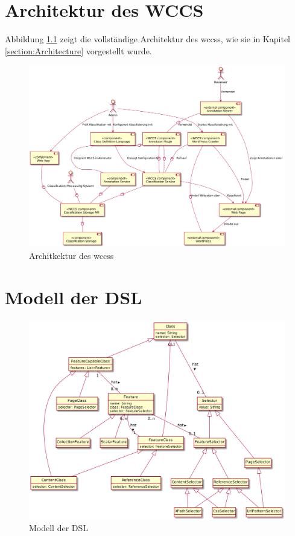 \chapter{Architektur des WCCS}
    Abbildung \ref{image:wccsExternalArchitecture} zeigt die vollständige Architektur des \glspl{wccs},
    wie sie in Kapitel \ref{section:Architecture} vorgestellt wurde.

    \begin{figure}[htb]
        \centering
        \includegraphics[width=\textwidth]{../resources/architecture/complete_architecture.png}
        \caption{Architkektur des \glspl{wccs}}
        \label{image:wccsExternalArchitecture}
    \end{figure}

\chapter{Modell der DSL}
    \begin{figure}[htb]
        \centering
        \includegraphics[width=\textwidth]{../resources/dsl/model.png}
        \caption{Modell der DSL}
        \label{image:dslCompleteModel}
    \end{figure}